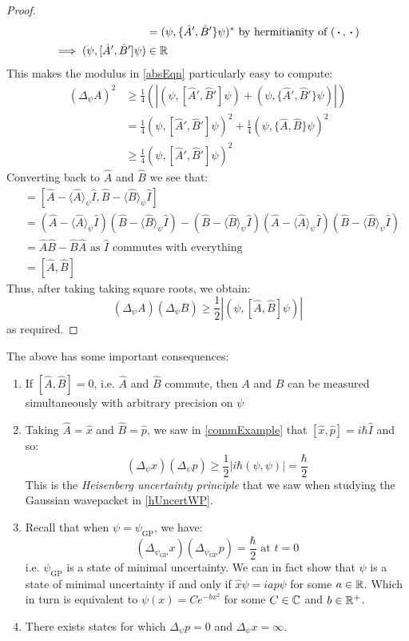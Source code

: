 \documentclass[../main.tex]{subfiles}
\begin{document}
\begin{proof}
\begin{align*}
                                        &= (\psi, \{\hat{A}', \hat{B}'\}\psi)^{*} \text{ by hermitianity of $({\hspace{0.18em}\boldsymbol{\cdot}\hspace{0.18em}}, {\hspace{0.18em}\boldsymbol{\cdot}\hspace{0.18em}})$} \\
    \implies (\psi, [\hat{A}', \hat{B}'] \psi) &\in \mathbb{R}
  \end{align*}
  This makes the modulus in \cref{absEqn} particularly easy to compute:
  \begin{align*}
    (\Delta_{\psi} A)^2 &\geq \frac{1}{4}(|(\psi, [\hat{A}', \hat{B}']\psi) + (\psi, \{\hat{A}', \hat{B}'\}\psi)|) \\
                        &= \frac{1}{4}(\psi, [\hat{A}', \hat{B}']\psi)^2 + \frac{1}{4}(\psi, \{\hat{A}, \hat{B}\}\psi)^2 \\
                        &\geq \frac{1}{4}(\psi, [\hat{A}', \hat{B}']\psi)^2
  \end{align*}
  Converting back to $\hat{A}$ and $\hat{B}$ we see that:
  \begin{align*}
    [\hat{A}', \hat{B}'] &= [\hat{A} - \langle \hat{A} \rangle_{\psi} \hat{I}, \hat{B} - \langle \hat{B} \rangle_{\psi} \hat{I}] \\
                         &= (\hat{A} - \langle \hat{A} \rangle_{\psi} \hat{I})(\hat{B} - \langle \hat{B} \rangle_{\psi} \hat{I}) - (\hat{B} - \langle \hat{B} \rangle_{\psi} \hat{I})(\hat{A} - \langle \hat{A} \rangle_{\psi} \hat{I})(\hat{B} - \langle \hat{B} \rangle_{\psi} \hat{I}) \\
                         &= \hat{A} \hat{B} - \hat{B} \hat{A} \text{ as $\hat{I}$ commutes with everything} \\
                         &= [\hat{A}, \hat{B}]
  \end{align*}
  Thus, after taking taking square roots, we obtain:
  \[
    (\Delta_{\psi} A)(\Delta_{\psi} B) \geq \frac{1}{2} |(\psi, [\hat{A}, \hat{B}] \psi)|
  \]
  as required.
\end{proof}
The above has some important consequences:
\begin{enumerate}
  \item If $[\hat{A}, \hat{B}] = 0$, i.e. $\hat{A}$ and $\hat{B}$ commute, then $A$ and $B$ can be measured simultaneously with arbitrary precision on $\psi$
  \item Taking $\hat{A} = \hat{x}$ and $\hat{B} = \hat{p}$, we saw in \cref{commExample} that $[\hat{x}, \hat{p}] = i\hbar\hat{I}$ and so:
    \[
      (\Delta_{\psi} x)(\Delta_{\psi} p) \geq \frac{1}{2}|i\hbar(\psi, \psi)| = \frac{\hbar}{2}
    \]
    This is the \textit{Heisenberg uncertainty principle} that we saw when studying the Gaussian wavepacket in \cref{hUncertWP}.
  \item Recall that when $\psi = \psi_{\text{GP}}$, we have:
    \[
      (\Delta_{\psi_{\text{GP}}} x)(\Delta_{\psi_{\text{GP}}} p) = \frac{\hbar}{2} \text{ at } t =0
    \]
    i.e. $\psi_{\text{GP}}$ is a state of minimal uncertainty.
    We can in fact show that $\psi$ is a state of minimal uncertainty if and only if $\hat{x} \psi = ia\hat{p} \psi$ for some $a \in \mathbb{R}$.
    Which in turn is equivalent to $\psi(x) = Ce^{-bx^2}$ for some $C \in \mathbb{C}$ and $b \in \mathbb{R}^{+}$.
  \item There exists states for which $\Delta_{\psi} p = 0$ and $\Delta_{\psi} x = \infty$.
\end{enumerate}
\end{document}
